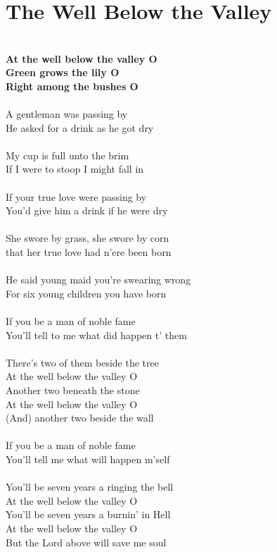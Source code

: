\documentclass[letterpaper,14pt]{extarticle}
\begin{document}
\section{The Well Below the Valley}
\noindent
\\\textbf{At the well below the valley O
\\Green grows the lily O
\\Right among the bushes O}
\\
\\A gentleman was passing by
\\He asked for a drink as he got dry
\\
\\My cup is full unto the brim
\\If I were to stoop I might fall in
\\
\\If your true love were passing by
\\You'd give him a drink if he were dry
\\
\\She swore by grass, she swore by corn
\\that her true love had n'ere been born
\\
\\He said young maid you're swearing wrong
\\For six young children you have born
\\
\\If you be a man of noble fame
\\You'll tell to me what did happen t' them
\\
\\There's two of them beside the tree
\\At the well below the valley O
\\Another two beneath the stone
\\At the well below the valley O
\\(And) another two beside the wall
\\
\\If you be a man of noble fame
\\You'll tell me what will happen m'self
\\
\\You'll be seven years a ringing the bell
\\At the well below the valley O
\\You'll be seven years a burnin' in Hell
\\At the well below the valley O
\\But the Lord above will save me soul
\end{document}
